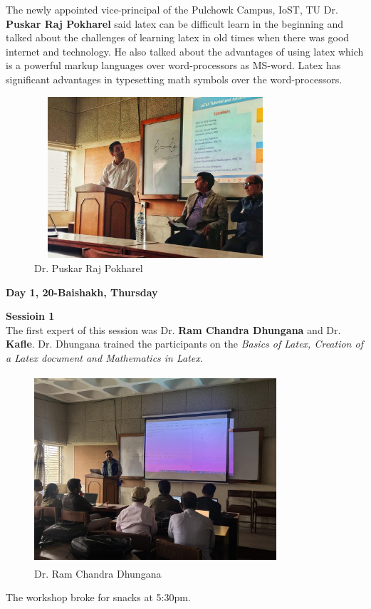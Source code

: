 \message{ !name(latexworkhop_report.tex)}\documentclass[a4paper,12pt]{report}
\begin{document}
The newly appointed vice-principal of the Pulchowk Campus, IoST, TU Dr.\textbf{ Puskar Raj Pokharel} said latex can be difficult learn in the beginning and talked about the challenges of learning latex in old times when there was good internet and technology. He also talked about the advantages of using latex which is a powerful markup languages over word-processors as MS-word. Latex has significant advantages in typesetting math symbols over the word-processors.

\begin{figure}[h!]
  \centering
  \includegraphics[height=6cm, width=9cm]{puskarsir2.jpg}
  \caption{Dr. Puskar Raj Pokharel}
\end{figure}
\clearpage

\begin{center}
  {\bfseries \Large Day 1, 20-Baishakh, Thursday}
\end{center}
\vspace{3mm}

{\bfseries \large Sessioin 1}\\[3mm]
The first expert of this session was Dr. \textbf{Ram Chandra Dhungana} and Dr. \textbf{Kafle}. Dr. Dhungana trained the participants on the \textit{Basics of Latex, Creation of a Latex document and Mathematics in Latex}.
\vspace{3mm}

\begin{figure}[h!]
  \centering
  \includegraphics[height=7cm, width=9cm]{rcd.jpg}
  \caption{Dr. Ram Chandra Dhungana}
\end{figure}
\vspace{2mm}
The workshop broke for snacks at 5:30pm.
\end{document}
